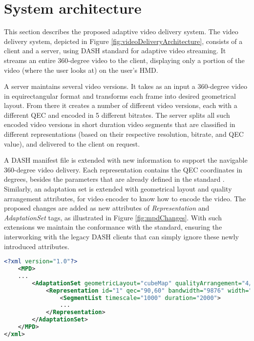 

\section{System architecture}

This section describes the proposed adaptive video delivery system. The video delivery system, depicted in Figure \ref{fig:videoDeliveryArchitecture}, consists of a client and a server, using DASH standard \cite{Stockhammer11} for adaptive video streaming. It streams an entire 360-degree video to the client, displaying only a portion of the video (where the user looks at) on the user's HMD.



A server maintains several video versions. It takes as an input a 360-degree video in equirectangular format and transforms each frame into desired geometrical layout. From there it creates a number of different video versions, each with a different QEC and encoded in 5 different bitrates. The server splits all such encoded video versions in short duration video segments that are classified in different representations (based on their respective resolution, bitrate, and QEC value), and delivered to the client on request.

A DASH manifest file is extended with new information to support the navigable 360-degree video delivery. Each representation contains the QEC coordinates in degrees, besides the parameters that are already defined in the standard \cite{}. Similarly, an adaptation set is extended with geometrical layout and quality arrangement attributes, for video encoder to know how to encode the video. The proposed changes are added as new attributes of \textit{Representation} and \textit{AdaptationSet} tags, as illustrated in Figure \ref{fig:mpdChanges}. With such extensions we maintain the conformance with the standard, ensuring the interworking with the legacy DASH clients that can simply ignore these newly introduced attributes.

\begin{lstlisting}[language=xml, frame=single, backgroundcolor=\color{white}, caption=Extensions of MPD file]
<?xml version="1.0"?>
    <MPD>
    ...
        <AdaptationSet geometricLayout="cubeMap" qualityArrangement="4/1/1">
            <Representation id="1" qec="90,60" bandwidth="9876" width="1920" height="1080" frameRate="30">
                <SegmentList timescale="1000" duration="2000">
                ...
            </Representation>
        </AdaptationSet>
    </MPD>
</xml>
\end{lstlisting}
\label{fig:mpdChanges}

